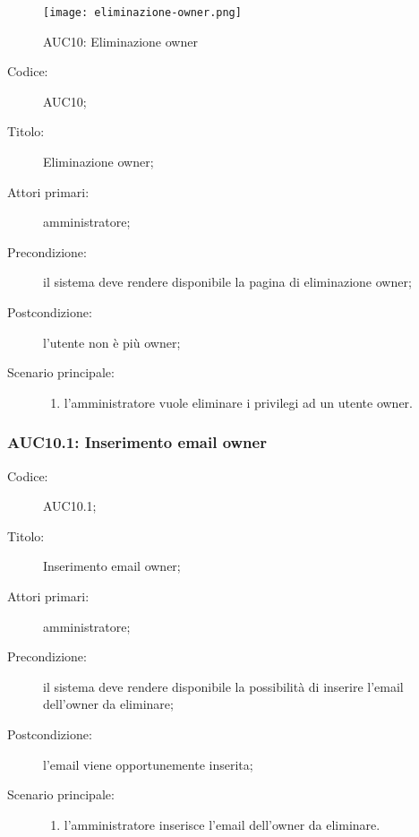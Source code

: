 \documentclass[../../../analisi-dei-requisiti.tex]{subfiles}
\begin{document}
\begin{figure}[H]
  \centering
  \texttt{[image: eliminazione-owner.png]}
  \caption{AUC10: Eliminazione owner}%
  \label{fig:AUC10}
\end{figure}

\begin{description}
  \item[Codice:] AUC10;
  \item[Titolo:] Eliminazione owner;
  \item[Attori primari:] amministratore;
  \item[Precondizione:] il sistema deve rendere disponibile la pagina di eliminazione owner;
  \item[Postcondizione:] l'utente non è più owner;
  \item[Scenario principale:]
  \begin{enumerate}
    \item l'amministratore vuole eliminare i privilegi ad un utente owner.
  \end{enumerate}
\end{description}

\subsubsection{AUC10.1: Inserimento email owner}%
\label{subs:AUC10.1}
\begin{description}
  \item[Codice:] AUC10.1;
  \item[Titolo:] Inserimento email owner;
  \item[Attori primari:] amministratore;
  \item[Precondizione:] il sistema deve rendere disponibile la possibilità di inserire l'email dell'owner da eliminare;
  \item[Postcondizione:] l'email viene opportunemente inserita;
  \item[Scenario principale:]
  \begin{enumerate}
    \item l'amministratore inserisce l'email dell'owner da eliminare.
  \end{enumerate}
\end{description}
\end{document}
